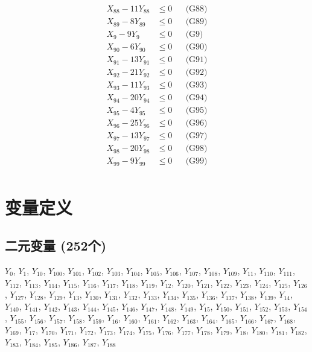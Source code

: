 \documentclass[a4paper,10pt]{article}
\begin{document}
{\begin{align}
X_{88} - 11Y_{88} &\leq 0 && \text{(G88)} \\
\allowbreak
X_{89} - 8Y_{89} &\leq 0 && \text{(G89)} \\
X_{9} - 9Y_{9} &\leq 0 && \text{(G9)} \\
X_{90} - 6Y_{90} &\leq 0 && \text{(G90)} \\
X_{91} - 13Y_{91} &\leq 0 && \text{(G91)} \\
X_{92} - 21Y_{92} &\leq 0 && \text{(G92)} \\
X_{93} - 11Y_{93} &\leq 0 && \text{(G93)} \\
X_{94} - 20Y_{94} &\leq 0 && \text{(G94)} \\
X_{95} - 4Y_{95} &\leq 0 && \text{(G95)} \\
X_{96} - 25Y_{96} &\leq 0 && \text{(G96)} \\
X_{97} - 13Y_{97} &\leq 0 && \text{(G97)} \\
X_{98} - 20Y_{98} &\leq 0 && \text{(G98)} \\
X_{99} - 9Y_{99} &\leq 0 && \text{(G99)} \\
\end{align}}

\section{变量定义}

\subsection{二元变量 (252个)}

{\small $Y_{0}$, $Y_{1}$, $Y_{10}$, $Y_{100}$, $Y_{101}$, $Y_{102}$, $Y_{103}$, $Y_{104}$, $Y_{105}$, $Y_{106}$, $Y_{107}$, $Y_{108}$, $Y_{109}$, $Y_{11}$, $Y_{110}$, $Y_{111}$, $Y_{112}$, $Y_{113}$, $Y_{114}$, $Y_{115}$, $Y_{116}$, $Y_{117}$, $Y_{118}$, $Y_{119}$, $Y_{12}$, $Y_{120}$, $Y_{121}$, $Y_{122}$, $Y_{123}$, $Y_{124}$, $Y_{125}$, $Y_{126}$, $Y_{127}$, $Y_{128}$, $Y_{129}$, $Y_{13}$, $Y_{130}$, $Y_{131}$, $Y_{132}$, $Y_{133}$, $Y_{134}$, $Y_{135}$, $Y_{136}$, $Y_{137}$, $Y_{138}$, $Y_{139}$, $Y_{14}$, $Y_{140}$, $Y_{141}$, $Y_{142}$, $Y_{143}$, $Y_{144}$, $Y_{145}$, $Y_{146}$, $Y_{147}$, $Y_{148}$, $Y_{149}$, $Y_{15}$, $Y_{150}$, $Y_{151}$, $Y_{152}$, $Y_{153}$, $Y_{154}$, $Y_{155}$, $Y_{156}$, $Y_{157}$, $Y_{158}$, $Y_{159}$, $Y_{16}$, $Y_{160}$, $Y_{161}$, $Y_{162}$, $Y_{163}$, $Y_{164}$, $Y_{165}$, $Y_{166}$, $Y_{167}$, $Y_{168}$, $Y_{169}$, $Y_{17}$, $Y_{170}$, $Y_{171}$, $Y_{172}$, $Y_{173}$, $Y_{174}$, $Y_{175}$, $Y_{176}$, $Y_{177}$, $Y_{178}$, $Y_{179}$, $Y_{18}$, $Y_{180}$, $Y_{181}$, $Y_{182}$, $Y_{183}$, $Y_{184}$, $Y_{185}$, $Y_{186}$, $Y_{187}$, $Y_{188}$}
\end{document}

